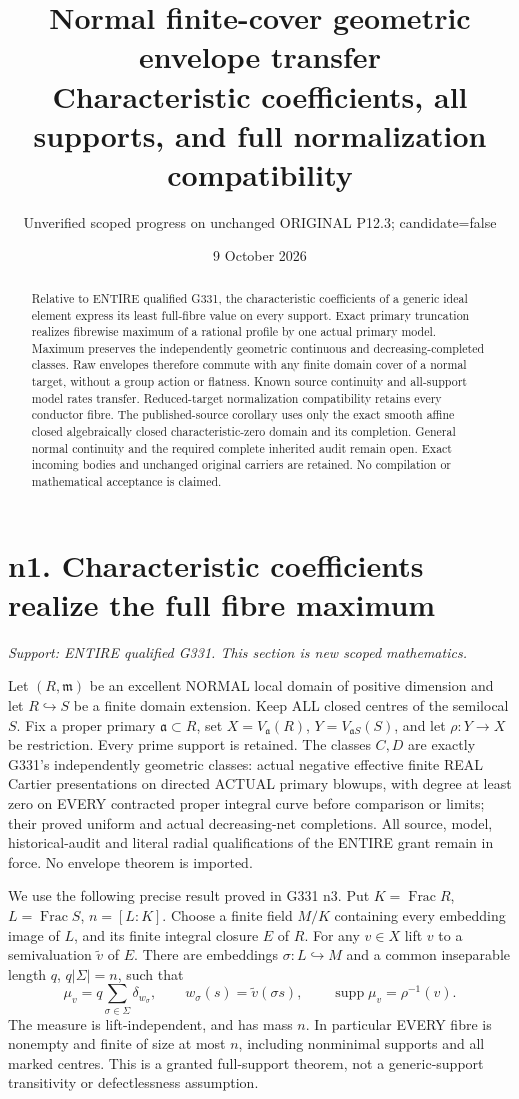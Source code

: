 \documentclass[11pt]{article}
\title{Normal finite-cover geometric envelope transfer\\
Characteristic coefficients, all supports, and full normalization compatibility}
\author{Unverified scoped progress on unchanged ORIGINAL P12.3; candidate=false}
\date{9 October 2026}
\begin{document}
\maketitle
\begin{abstract}
Relative to ENTIRE qualified G331, the characteristic coefficients of a
generic ideal element express its least full-fibre value on every support.
Exact primary truncation realizes fibrewise maximum of a rational profile
by one actual primary model. Maximum preserves the independently geometric
continuous and decreasing-completed classes. Raw envelopes therefore commute
with any finite domain cover of a normal target, without a group action or
flatness. Known source continuity and all-support model rates transfer.
Reduced-target normalization compatibility retains every conductor fibre.
The published-source corollary uses only the exact smooth affine closed
algebraically closed characteristic-zero domain and its completion.
General normal continuity and the required complete inherited audit remain
open. Exact incoming bodies and unchanged original carriers are retained.
No compilation or mathematical acceptance is claimed.
\end{abstract}
\tableofcontents
\section{n1. Characteristic coefficients realize the full fibre maximum}
\textit{Support: ENTIRE qualified G331. This section is new scoped mathematics.}

Let $(R,\mathfrak m)$ be an excellent NORMAL local domain of positive
dimension and let $R\hookrightarrow S$ be a finite domain extension.
Keep ALL closed centres of the semilocal $S$. Fix a proper primary
$\mathfrak a\subset R$, set $X=V_{\mathfrak a}(R)$,
$Y=V_{\mathfrak aS}(S)$, and let $\rho:Y\to X$ be restriction.
Every prime support is retained. The classes $C,D$ are exactly G331's
independently geometric classes: actual negative effective finite REAL
Cartier presentations on directed ACTUAL primary blowups, with degree
at least zero on EVERY contracted proper integral curve before comparison
or limits; their proved uniform and actual decreasing-net completions.
All source, model, historical-audit and literal radial qualifications of
the ENTIRE grant remain in force. No envelope theorem is imported.

We use the following precise result proved in G331 n3. Put
$K=\operatorname{Frac}R$, $L=\operatorname{Frac}S$, $n=[L:K]$.
Choose a finite field $M/K$ containing every embedding image of $L$, and
its finite integral closure $E$ of $R$. For any $v\in X$ lift $v$ to
a semivaluation $\widetilde v$ of $E$. There are embeddings
$\sigma:L\hookrightarrow M$ and a common inseparable length $q$,
$q|\Sigma|=n$, such that
\[
 \mu_v=q\sum_{\sigma\in\Sigma}\delta_{w_\sigma},\qquad
 w_\sigma(s)=\widetilde v(\sigma s),
 \qquad \operatorname{supp}\mu_v=\rho^{-1}(v).
\]
The measure is lift-independent, and has mass $n$. In particular EVERY
fibre is nonempty and finite of size at most $n$, including nonminimal
supports and all marked centres. This is a granted full-support theorem,
not a generic-support transitivity or defectlessness assumption.
\end{document}
